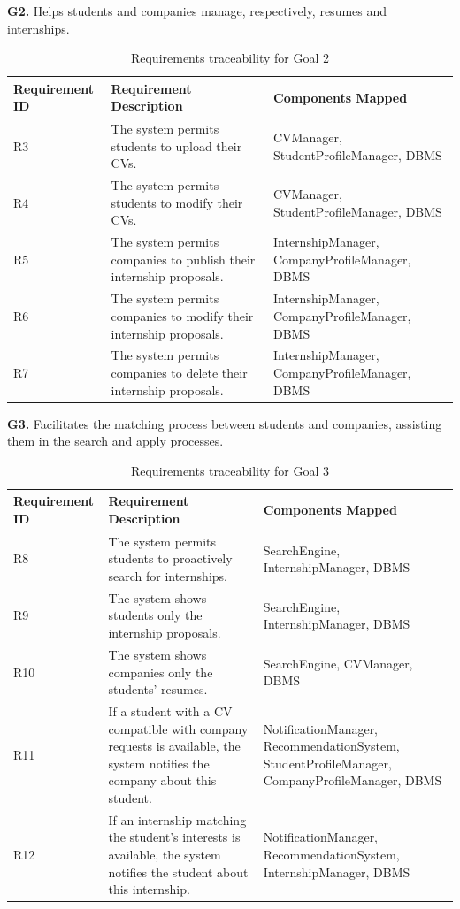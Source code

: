 \documentclass[12pt]{article}
\numberwithin{figure}{section}
\numberwithin{table}{section}
\begin{document}
\textbf{G2.}
Helps students and companies manage, respectively, resumes and internships.

\begin{table}[H]
    \centering
    \begin{tabularx}{\textwidth}{|l|X|X|}
        \hline
        \textbf{Requirement ID} & \textbf{Requirement Description} & \textbf{Components Mapped} \\
        \hline
        R3 & The system permits students to upload their CVs. & CVManager, StudentProfileManager, DBMS \\
        \hline
        R4 & The system permits students to modify their CVs. & CVManager, StudentProfileManager, DBMS \\
        \hline
        R5 & The system permits companies to publish their internship proposals. & InternshipManager, CompanyProfileManager, DBMS \\
        \hline
        R6 & The system permits companies to modify their internship proposals. & InternshipManager, CompanyProfileManager, DBMS \\
        \hline
        R7 & The system permits companies to delete their internship proposals. & InternshipManager, CompanyProfileManager, DBMS \\
        \hline
    \end{tabularx}
    \caption{Requirements traceability for Goal 2}
    \label{tab:goal2}
\end{table}
\newpage
\textbf{G3.}
Facilitates the matching process between students and companies, assisting them in the search and apply processes.

\begin{table}[H]
    \centering
    \begin{tabularx}{\textwidth}{|l|X|X|}
        \hline
        \textbf{Requirement ID} & \textbf{Requirement Description} & \textbf{Components Mapped} \\
        \hline
        R8 & The system permits students to proactively search for internships. & SearchEngine, InternshipManager, DBMS \\
        \hline
        R9 & The system shows students only the internship proposals. & SearchEngine, InternshipManager, DBMS \\
        \hline
        R10 & The system shows companies only the students' resumes. & SearchEngine, CVManager, DBMS \\
        \hline
        R11 & If a student with a CV compatible with company requests is available, the system notifies the company about this student. & NotificationManager, RecommendationSystem, StudentProfileManager, CompanyProfileManager, DBMS \\
        \hline
        R12 & If an internship matching the student's interests is available, the system notifies the student about this internship. & NotificationManager, RecommendationSystem, InternshipManager, DBMS \\
        \hline
    \end{tabularx}
    \caption{Requirements traceability for Goal 3}
    \label{tab:goal3}
\end{table}
\end{document}
